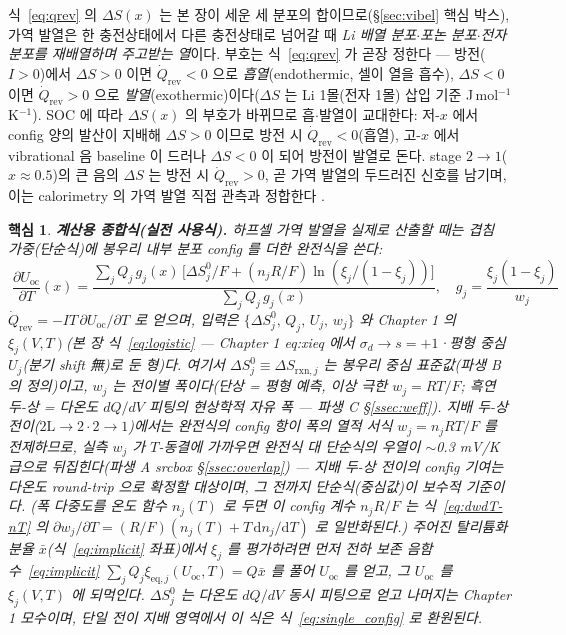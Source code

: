 \documentclass[11pt,a4paper]{article}
\newtheorem*{keybox}{핵심}
\newcommand{\rxn}{\mathrm{rxn}}
\newcommand{\eq}{\mathrm{eq}}
\newcommand{\rev}{\mathrm{rev}}
\newcommand{\oc}{\mathrm{oc}}
\begin{document}
식~\eqref{eq:qrev} 의 $\Delta S(x)$ 는 본 장이 세운 세 분포의 합이므로(\S\ref{sec:vibel} 핵심 박스), 가역
발열은 한 충전상태에서 다른 충전상태로 넘어갈 때 \emph{Li 배열 분포$\cdot$포논 분포$\cdot$전자 분포를 재배열하며
주고받는 열}이다. 부호는 식~\eqref{eq:qrev} 가 곧장 정한다 — 방전($I>0$)에서 $\Delta S>0$ 이면 $\dot Q_\rev<0$ 으로
\emph{흡열}(endothermic, 셀이 열을 흡수), $\Delta S<0$ 이면 $\dot Q_\rev>0$ 으로 \emph{발열}(exothermic)이다($\Delta S$
는 Li 1몰(전자 1몰) 삽입 기준 J\,mol$^{-1}$K$^{-1}$). SOC 에 따라 $\Delta S(x)$ 의 부호가 바뀌므로 흡$\cdot$발열이 교대한다: 저-$x$ 에서
config 양의 발산이 지배해 $\Delta S>0$ 이므로 방전 시 $\dot Q_\rev<0$(흡열), 고-$x$ 에서 vibrational 음
baseline 이 드러나 $\Delta S<0$ 이 되어 방전이 발열로 돈다. stage $2\to1$($x\approx0.5$)의 큰 음의 $\Delta S$
는 방전 시 $\dot Q_\rev>0$, 곧 가역 발열의 두드러진 신호를 남기며, 이는 calorimetry 의 가역 발열 직접 관측과
정합한다 \cite{standardised2024}.

\begin{keybox}
\textbf{계산용 종합식(실전 사용식).} 하프셀 가역 발열을 실제로 산출할 때는 겹침 가중(단순식)에 봉우리 내부 분포
config 를 더한 \emph{완전식}을 쓴다:
\begin{equation}
\boxed{\;\frac{\partial U_\oc}{\partial T}(x)
=\frac{\sum_j Q_j\,g_j(x)\,\bigl[\Delta S^0_j/F+(n_jR/F)\ln(\xi_j/(1-\xi_j))\bigr]}{\sum_j Q_j\,g_j(x)},\quad
g_j=\frac{\xi_j(1-\xi_j)}{w_j}\;}
\label{eq:complete}
\end{equation}
$\dot Q_\rev=-IT\,\partial U_\oc/\partial T$ 로 얻으며, \emph{입력}은 $\{\Delta S^0_j,\,Q_j,\,U_j,\,w_j\}$ 와 Chapter 1 의
$\xi_j(V,T)$(본 장 식~\eqref{eq:logistic} — Chapter 1 eq:xieq 에서 $\sigma_d\to s{=}+1$·평형 중심 $U_j$(분기 shift 無)로 둔 형)다. 여기서 $\Delta S^0_j\equiv\Delta S_{\rxn,j}$ 는 봉우리 중심 표준값(파생 B 의
정의)이고, $w_j$ 는 전이별 폭이다(단상 = 평형 예측, 이상 극한 $w_j{=}RT/F$; 흑연 두-상 = 다온도 $dQ/dV$
피팅의 현상학적 자유 폭 — 파생 C \S\ref{ssec:weff}). 지배 두-상 전이($2\mathrm L\!\to\!2\cdot2\!\to\!1$)에서는 완전식의
config 항이 폭의 열적 서식 $w_j=n_jRT/F$ 를 전제하므로, 실측 $w_j$ 가 $T$-동결에 가까우면 완전식 대 단순식의
우열이 $\sim$0.3 mV/K 급으로 뒤집힌다(파생 A srcbox \S\ref{ssec:overlap}) — 지배 두-상 전이의 config 기여는
다온도 round-trip 으로 확정할 대상이며, 그 전까지 단순식(중심값)이 보수적 기준이다. (폭 다중도를 온도 함수 $n_j(T)$ 로
두면 이 config 계수 $n_jR/F$ 는 식~\eqref{eq:dwdT-nT} 의 $\partial w_j/\partial T=(R/F)(n_j(T)+T\,\mathrm{d}n_j/\mathrm{d}T)$ 로 일반화된다.)
주어진 탈리튬화 분율 $\bar x$(식~\eqref{eq:implicit} 좌표)에서 $\xi_j$ 를 평가하려면 먼저 전하 보존
음함수~\eqref{eq:implicit} $\sum_j Q_j\xi_{\eq,j}(U_\oc,T)=Q\bar x$ 를 풀어 $U_\oc$ 를 얻고, 그 $U_\oc$ 를
$\xi_j(V,T)$ 에 되먹인다. $\Delta S^0_j$ 는 다온도 $dQ/dV$ 동시 피팅으로 얻고 나머지는 Chapter 1 모수이며, 단일 전이 지배 영역에서 이 식은
식~\eqref{eq:single_config} 로 환원된다.
\end{keybox}
\end{document}
